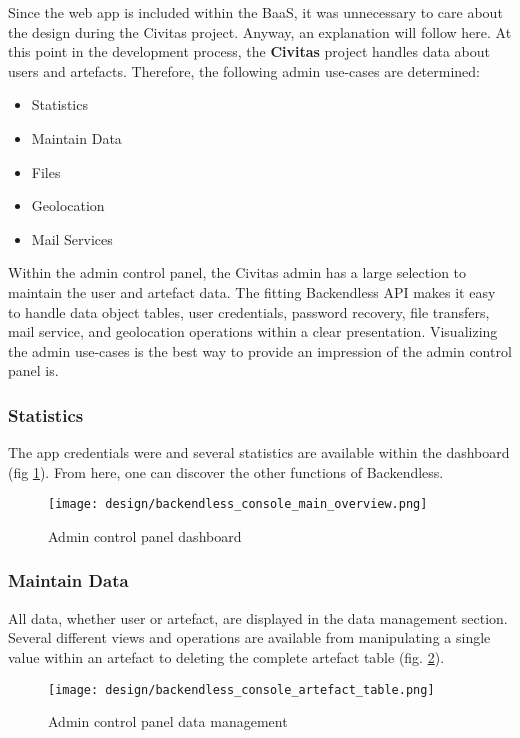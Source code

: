 Since the web app is included within the BaaS, it was unnecessary to care about the design during the Civitas project. Anyway, an explanation will follow here.
At this point in the development process, the \textbf{Civitas} project handles data about users and artefacts. Therefore, the following admin use-cases are determined:
\begin{itemize}
\item Statistics
\item Maintain Data
\item Files
\item Geolocation
\item Mail Services
\end{itemize}

Within the admin control panel, the Civitas admin has a large selection to maintain the user and artefact data. The fitting Backendless API makes it easy to handle data object tables, user credentials, password recovery, file transfers, mail service, and geolocation operations within a clear presentation. Visualizing the admin use-cases is the best way to provide an impression of the admin control panel is.

\subsubsection*{Statistics}
The app credentials were and several statistics are available within the dashboard (fig \ref{fig:backendless_console_main_overview}). From here, one can discover the other functions of Backendless.

\begin{figure}[H]
    \centering \texttt{[image: design/backendless\_console\_main\_overview.png]}
    \caption{Admin control panel dashboard}
    \label{fig:backendless_console_main_overview}
\end{figure}


\subsubsection*{Maintain Data}
All data, whether user or artefact, are displayed in the data management section. Several different views and operations are available from manipulating a single value within an artefact to deleting the complete artefact table (fig. \ref{fig:backendless_console_artefact_table}).
\begin{figure}[H]
    \centering \texttt{[image: design/backendless\_console\_artefact\_table.png]}
    \caption{Admin control panel data management}
    \label{fig:backendless_console_artefact_table}
\end{figure}

